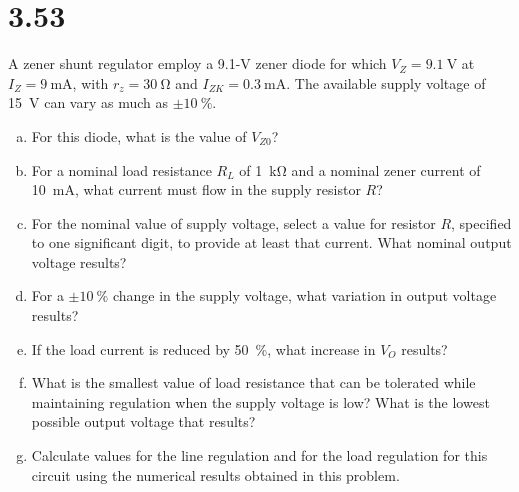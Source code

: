 \documentclass[12pt, a4paper]{article}
\theoremstyle{mystyle}	%
\begin{document}
\section{3.53}
A zener shunt regulator employ a 9.1-\si{\V} zener diode for which
$V_Z = \SI{9.1}{\V}$ at $I_Z = \SI{9}{\mA}$, with $r_z = \SI{30}{\ohm}$
and $I_{ZK}=\SI{0.3}{\mA}$. The available supply voltage of \SI{15}{\V}
can vary as much as $\pm\SI{10}{\percent}$.
\begin{enumerate}[(a)]
  \item For this diode, what is the value of $V_{Z0}$?
  \item For a nominal load resistance $R_L$ of \SI{1}{\kohm}
and a nominal zener current of \SI{10}{\mA}, what current must flow
in the supply resistor $R$?
  \item For the nominal value of supply voltage, select a value for resistor $R$, specified to one significant digit, to provide at least that current. What nominal output voltage results?
  \item For a $\pm\SI{10}{\percent}$ change in the supply voltage, what variation
in output voltage results?
  \item If the load current is reduced by
\SI{50}{\percent}, what increase in $V_O$ results?
  \item What is the smallest value of load resistance that can be tolerated while maintaining
regulation when the supply voltage is low?  What is the lowest possible output voltage that results? 
  \item Calculate values for the line regulation
and for the load regulation for this circuit using the numerical results
obtained in this problem.
\end{enumerate}
\end{document}
